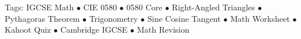 \documentclass[11pt,a4paper]{article}
\begin{document}
\vspace{14pt}
\begin{center}
  \sffamily\scriptsize\textcolor{textmuted}{
    Tags: IGCSE Math $\bullet$ CIE 0580 $\bullet$ 0580 Core $\bullet$ Right-Angled Triangles $\bullet$ Pythagoras Theorem $\bullet$ Trigonometry $\bullet$ Sine Cosine Tangent $\bullet$ Math Worksheet $\bullet$ Kahoot Quiz $\bullet$ Cambridge IGCSE $\bullet$ Math Revision
  }
\end{center}
\end{document}
